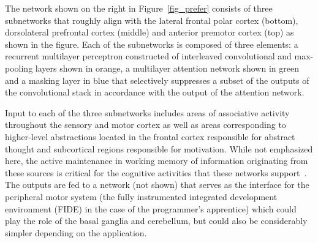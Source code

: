 \documentclass[letterpaper,11pt]{article}
\def\footnote#1{{}}
\def\urlh#1{{}}
\begin{document}

The network shown on the right in Figure~{\urlh{#fig_Prefrontal_Hierarchy_Biology_Technology}{\ref{fig_prefer}}} consists of three subnetworks that roughly align with the {\urlh{https://en.wikipedia.org/wiki/Frontal_lobe}{lateral frontal polar cortex}} (bottom), {\urlh{https://en.wikipedia.org/wiki/Dorsolateral_prefrontal_cortex}{dorsolateral prefrontal cortex}} (middle) and {\urlh{https://en.wikipedia.org/wiki/Premotor_cortex}{anterior premotor cortex}} (top) as shown in the figure. Each of the subnetworks is composed of three elements: a recurrent multilayer perceptron constructed of interleaved convolutional and max-pooling layers shown in orange, a multilayer attention network shown in green and a masking layer in blue that selectively suppresses a subset of the outputs of the convolutional stack in accordance with the output of the attention network.

Input to each of the three subnetworks includes areas of associative activity throughout the sensory and motor cortex as well as areas corresponding to higher-level abstractions located in the frontal cortex responsible for abstract thought and subcortical regions responsible for motivation. While not emphasized here, the active maintenance in working memory of information originating from these sources\footnote{%
  Susan Courtney provides an excellent overview of the many sources of information that are utilized by cognitive functions supported in the frontal cortex~\cite{CourtneyCABN-04}. In particular, her articulation of the role of attention and cognitive control aligns with the views that we've emphasized in class and that drive our designs:
\begin{quotation}
  [The circuits in the prefrontal cortex that drive goal directed planning and executive control] receive multimodal information about the current environment and have access to previously stored memories. The prefrontal cortex's extensive outputs allow for direct control of motor behavior, but they may also influence behavior indirectly by altering perceptual and cognitive representations and influencing the storage and retrieval of long-term memories.\\
  I suggest that attention and cognitive control are not directed actions or specific processes contained within any particular set of brain regions. Rather, what we experience and observe that we call attention and cognitive control are emergent properties dependent on the dis- tributed representation of all types of information, both that available from present perceptual input and the information currently sustained in WM, including contextual and motivational information.
%
\end{quotation}}
%
is critical for the cognitive activities that these networks support~\cite{CourtneyCABN-04,Goldman-RakicARN-88}. The outputs are fed to a network (not shown) that serves as the interface for the peripheral motor system (the fully instrumented integrated development environment (FIDE) in the case of the programmer's apprentice) which could play the role of the basal ganglia and cerebellum, but could also be considerably simpler depending on the application.
\end{document}
